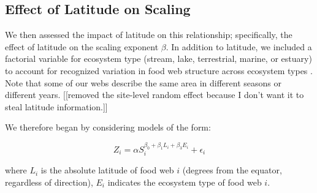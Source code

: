 \documentclass[12pt]{article}
\begin{document}





\subsection*{Effect of Latitude on Scaling}



We then assessed
the impact of latitude on this relationship; specifically, the effect of latitude on the scaling exponent $\beta$. 
In addition to latitude, we included a factorial variable for ecosystem type (stream, lake, terrestrial, marine, or estuary) to account for recognized variation in food web structure across ecosystem types \citep{}.
Note that some of our webs describe the same area in different
seasons or different years. [[removed the site-level random effect because I don't want it to steal latitude information.]]


We therefore began by considering models of the form:

\begin{equation}
\label{PowerLat}
Z_{i}=\alpha S_{i}^{\beta_{0}+\beta_{1}L_{i}+\beta_{3}E_{i}} + \epsilon_{i} 
\end{equation}

where $L_{i}$ is the absolute latitude of food web $i$ (degrees from the equator, regardless of direction),
$E_{i}$ indicates the ecosystem type of food web $i$.
\end{document}
